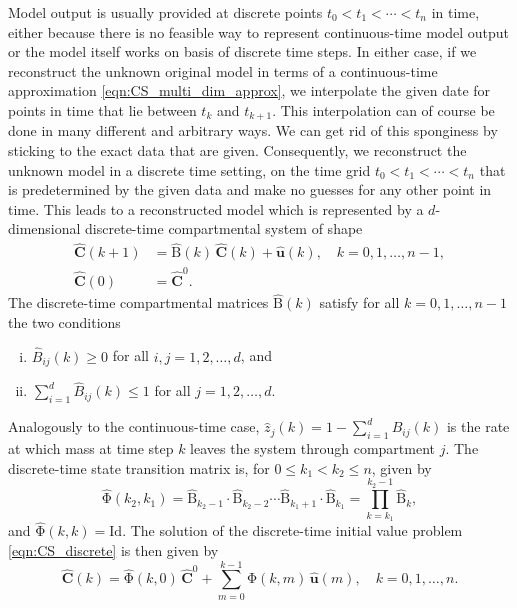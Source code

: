 \documentclass[11pt,a4paper]{article}
\renewcommand{\vec}[1]{\mathbf{#1}}
\newcommand{\tens}[1]{\mathrm{#1}}
\newcommand{\id}{\tens{Id}}
\newcommand{\suml}{\sum\limits}
\begin{document}
    Model output is usually provided at discrete points $t_0<t_1<\cdots<t_n$ in time, either because there is no feasible way to represent continuous-time model output or the model itself works on basis of discrete time steps.
    In either case, if we reconstruct the unknown original model in terms of a continuous-time approximation \eqref{eqn:CS_multi_dim_approx}, we interpolate the given date for points in time that lie between $t_k$ and $t_{k+1}$.
    This interpolation can of course be done in many different and arbitrary ways.
    We can get rid of this sponginess by sticking to the exact data that are given.
    Consequently, we reconstruct the unknown model in a discrete time setting, on the time grid $t_0<t_1<\cdots<t_n$ that is predetermined by the given data and make no guesses for any other point in time.
    This leads to a reconstructed model which is represented by a $d$-dimensional discrete-time compartmental system of shape
    \begin{equation}\label{eqn:CS_discrete}
        \begin{aligned}
            \widehat{\vec{C}}(k+1) &= \widehat{\tens{B}}(k)\,\widehat{\vec{C}}(k) + \widehat{\vec{u}}(k),\quad k=0,1,\ldots,n-1,\\
            \widehat{\vec{C}}(0) &= \widehat{\vec{C}}^0.
        \end{aligned}
    \end{equation}
    The discrete-time compartmental matrices $\widehat{\tens{B}}(k)$ satisfy for all $k=0,1,\ldots,n-1$ the two conditions
    \begin{enumerate}[(i)]
        \item $\widehat{B}_{ij}(k)\geq0$ for all $i,j=1,2,\ldots,d$, and
        \item $\suml_{i=1}^d \widehat{B}_{ij}(k)\leq 1$ for all $j=1,2,\ldots,d$.
    \end{enumerate}
    Analogously to the continuous-time case, $\widehat{z}_j(k)=1-\sum_{i=1}^d \widehat{B}_{ij}(k)$ is the rate at which mass at time step $k$ leaves the system through compartment $j$.
    The discrete-time state transition matrix is, for $0\leq k_1<k_2\leq n$, given by
    \begin{equation*}
        \widehat{\tens{\Phi}}(k_2,k_1) = \widehat{\tens{B}}_{k_2-1}\cdot\widehat{\tens{B}}_{k_2-2}\cdots\widehat{\tens{B}}_{k_1+1}\cdot\widehat{\tens{B}}_{k_1} = \prod\limits_{k=k_1}^{k_2-1}\widehat{\tens{B}}_k,
    \end{equation*}
    and $\widehat{\tens{\Phi}}(k,k)=\id$.
    The solution of the discrete-time initial value problem \eqref{eqn:CS_discrete} is then given by
    \begin{equation*}
        \widehat{\vec{C}}(k) = \widehat{\tens{\Phi}}(k,0)\,\widehat{\vec{C}}^0 + \suml_{m=0}^{k-1} \widehat{\tens{\Phi}}(k,m)\,\widehat{\vec{u}}(m),\quad k=0,1,\ldots,n.
    \end{equation*}
    
\end{document}
